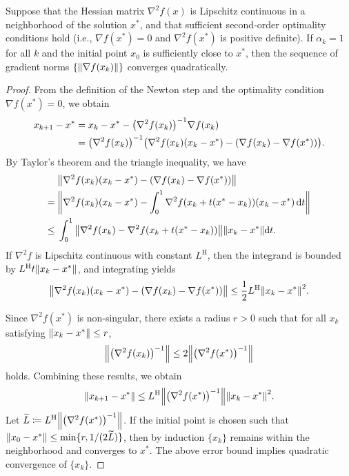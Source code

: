 \documentclass[en]{subfiles}
\begin{document}
\begin{theorem}
    \label{thm:newton-quadratic}
    Suppose that the Hessian matrix $\nabla^2 f(x)$ is Lipschitz continuous in a neighborhood of the solution $x^*$, and that sufficient second-order optimality conditions hold (i.e., $\nabla f(x^*)=0$ and $\nabla^2 f(x^*)$ is positive definite).
    If $\alpha_k=1$ for all $k$ and the initial point $x_0$ is sufficiently close to $x^*$,
    then the sequence of gradient norms $\{\norm{\nabla f(x_k)}\}$ converges quadratically.
\end{theorem}
\begin{proof}
    From the definition of the Newton step and the optimality condition $\nabla f(x^*)=0$, we obtain
    \begin{align*}
        x_{k+1} - x^*
         & = x_k - x^* - \qty(\nabla^2 f(x_k))^{-1}\nabla f(x_k)                                          \\
         & = \qty(\nabla^2 f(x_k))^{-1} \qty(\nabla^2 f(x_k)(x_k-x^*)-\qty(\nabla f(x_k)-\nabla f(x^*))).
    \end{align*}
    By Taylor's theorem and the triangle inequality, we have
    \begin{align*}
                & \norm{\nabla^2 f(x_k)(x_k-x^*)-\qty(\nabla f(x_k)-\nabla f(x^*))}                     \\
        =   {}  & \norm{\nabla^2 f(x_k)(x_k-x^*)-\int_0^1 \nabla^2 f(x_k+t(x^*-x_k)) (x_k - x^*)\dd{t}} \\
        \leq {} & \int_0^1 \norm{\nabla^2 f(x_k)-\nabla^2 f(x_k+t(x^*-x_k))}\norm{x_k-x^*}\dd t.
    \end{align*}
    If $\nabla^2 f$ is Lipschitz continuous with constant $L^{\mathrm{H}}$, then the integrand is bounded by $L^{\mathrm{H}}t\norm{x_k-x^*}$, and integrating yields
    \begin{equation*}
        \norm{\nabla^2 f(x_k)(x_k-x^*)-\qty(\nabla f(x_k)-\nabla f(x^*))}
        \le \frac{1}{2}L^{\mathrm{H}}\norm{x_k-x^*}^2.
    \end{equation*}

    Since $\nabla^2 f(x^*)$ is non-singular, there exists a radius $r>0$ such that for all $x_k$ satisfying $\norm{x_k-x^*}\le r$,
    \[
        \norm{\qty(\nabla^2 f(x_k))^{-1}}\le 2\norm{\qty(\nabla^2 f(x^*))^{-1}}
    \]
    holds.
    Combining these results, we obtain
    \begin{equation*}
        \norm{x_{k+1} - x^*}
        \le L^{\mathrm{H}}\norm{\qty(\nabla^2 f(x^*))^{-1}} \norm{x_k-x^*}^2.
    \end{equation*}
    Let $\widetilde L  \coloneqq  L^{\mathrm{H}}\norm{\qty(\nabla^2 f(x^*))^{-1}}$.
    If the initial point is chosen such that $\norm{x_0-x^*}\le \min\{r,1/(2\widetilde L)\}$, then by induction $\{x_k\}$ remains within the neighborhood and converges to $x^*$.
    The above error bound implies quadratic convergence of $\{x_k\}$.


\end{proof}
\end{document}
